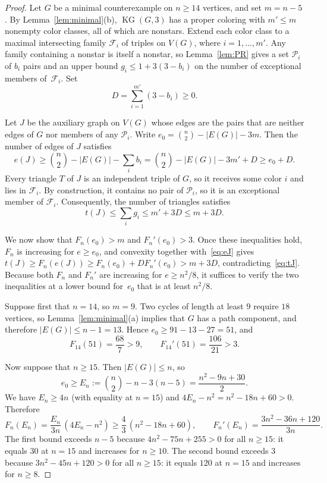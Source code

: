 \documentclass[11pt]{amsart}
\theoremstyle{definition}
\theoremstyle{remark}
\numberwithin{equation}{section}
\newcommand{\KG}{\operatorname{KG}}
\begin{document}
\begin{proof}
Let $G$ be a minimal counterexample on $n\ge14$ vertices, and set $m=n-5$. By
Lemma~\ref{lem:minimal}(b), $\KG(G,3)$ has a proper coloring with $m'\le m$
nonempty color classes, all of which are nonstars. Extend each color class to a
maximal intersecting family $\mathcal F_i$ of triples on $V(G)$, where
$i=1,\dots,m'$. Any family containing a nonstar is itself a nonstar, so
Lemma~\ref{lem:PR} gives a set $\mathcal P_i$ of $b_i$ pairs and an upper bound
$g_i\le1+3(3-b_i)$ on the number of exceptional members of~$\mathcal F_i$. Set
\[
D=\sum_{i=1}^{m'}(3-b_i)\ge0.
\]

Let $J$ be the auxiliary graph on $V(G)$ whose edges are the pairs that are
neither edges of $G$ nor members of any $\mathcal P_i$. Write
$e_0=\binom n2-|E(G)|-3m$. Then the number of edges of $J$ satisfies
\begin{equation}\label{eq:eJ}
e(J)\ge\binom n2-|E(G)|-\sum_i b_i=\binom n2-|E(G)|-3m'+D\ge e_0+D.
\end{equation}
Every triangle $T$ of $J$ is an independent triple of $G$, so it receives some
color $i$ and lies in $\mathcal F_i$. By construction, it contains no pair of
$\mathcal P_i$, so it is an exceptional member of $\mathcal F_i$. Consequently,
the number of triangles satisfies
\begin{equation}\label{eq:tJ}
t(J)\le\sum_i g_i\le m'+3D\le m+3D.
\end{equation}

We now show that $F_n(e_0)>m$ and $F_n'(e_0)>3$. Once these inequalities hold,
$F_n$ is increasing for $e\ge e_0$, and convexity together with~\eqref{eq:eJ}
gives $t(J)\ge F_n(e(J))\ge F_n(e_0)+DF_n'(e_0)>m+3D$, contradicting~\eqref{eq:tJ}.
Because both $F_n$ and $F_n'$ are increasing for $e\ge n^2/8$, it suffices to
verify the two inequalities at a lower bound for~$e_0$ that is at least
$n^2/8$.

Suppose first that $n=14$, so $m=9$. Two cycles of length at least $9$ require
$18$ vertices, so Lemma~\ref{lem:minimal}(a) implies that $G$ has a path
component, and therefore $|E(G)|\le n-1=13$. Hence $e_0\ge91-13-27=51$, and
\[
F_{14}(51)=\frac{68}{7}>9,\qquad F_{14}'(51)=\frac{106}{21}>3.
\]

Now suppose that $n\ge15$. Then $|E(G)|\le n$, so
\[
e_0\ge E_n:=\binom n2-n-3(n-5)=\frac{n^2-9n+30}{2}.
\]
We have $E_n\ge4n$ (with equality at $n=15$) and $4E_n-n^2=n^2-18n+60>0$.
Therefore
\[
F_n(E_n)=\frac{E_n}{3n}\,(4E_n-n^2)\ge\frac43\,(n^2-18n+60),
\qquad
F_n'(E_n)=\frac{3n^2-36n+120}{3n}.
\]
The first bound exceeds $n-5$ because $4n^2-75n+255>0$ for all $n\ge15$: it
equals $30$ at $n=15$ and increases for $n\ge10$. The second bound exceeds $3$
because $3n^2-45n+120>0$ for all $n\ge15$: it equals $120$ at $n=15$ and
increases for $n\ge8$.
\end{proof}
\end{document}
